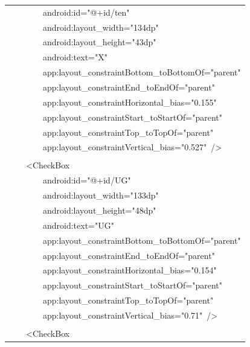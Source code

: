 \documentclass[a4paper,12pt]{article}
\begin{document}
\begin{longtable}{|p{}|}
{\ttfamily\small \ \ \ \ \ \ \ \ android:id="@+id/ten"} \\
{\ttfamily\small \ \ \ \ \ \ \ \ android:layout\_width="134dp"} \\
{\ttfamily\small \ \ \ \ \ \ \ \ android:layout\_height="43dp"} \\
{\ttfamily\small \ \ \ \ \ \ \ \ android:text="X"} \\
{\ttfamily\small \ \ \ \ \ \ \ \ app:layout\_constraintBottom\_toBottomOf="parent"} \\
{\ttfamily\small \ \ \ \ \ \ \ \ app:layout\_constraintEnd\_toEndOf="parent"} \\
{\ttfamily\small \ \ \ \ \ \ \ \ app:layout\_constraintHorizontal\_bias="0.155"} \\
{\ttfamily\small \ \ \ \ \ \ \ \ app:layout\_constraintStart\_toStartOf="parent"} \\
{\ttfamily\small \ \ \ \ \ \ \ \ app:layout\_constraintTop\_toTopOf="parent"} \\
{\ttfamily\small \ \ \ \ \ \ \ \ app:layout\_constraintVertical\_bias="0.527"\ /\textgreater{}} \\
\strut \\
{\ttfamily\small \ \ \ \ \textless{}CheckBox} \\
{\ttfamily\small \ \ \ \ \ \ \ \ android:id="@+id/UG"} \\
{\ttfamily\small \ \ \ \ \ \ \ \ android:layout\_width="133dp"} \\
{\ttfamily\small \ \ \ \ \ \ \ \ android:layout\_height="48dp"} \\
{\ttfamily\small \ \ \ \ \ \ \ \ android:text="UG"} \\
{\ttfamily\small \ \ \ \ \ \ \ \ app:layout\_constraintBottom\_toBottomOf="parent"} \\
{\ttfamily\small \ \ \ \ \ \ \ \ app:layout\_constraintEnd\_toEndOf="parent"} \\
{\ttfamily\small \ \ \ \ \ \ \ \ app:layout\_constraintHorizontal\_bias="0.154"} \\
{\ttfamily\small \ \ \ \ \ \ \ \ app:layout\_constraintStart\_toStartOf="parent"} \\
{\ttfamily\small \ \ \ \ \ \ \ \ app:layout\_constraintTop\_toTopOf="parent"} \\
{\ttfamily\small \ \ \ \ \ \ \ \ app:layout\_constraintVertical\_bias="0.71"\ /\textgreater{}} \\
\strut \\
{\ttfamily\small \ \ \ \ \textless{}CheckBox} \\

\end{longtable}
\end{document}
